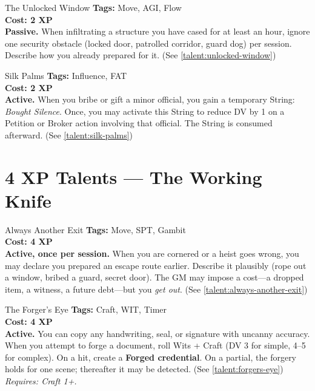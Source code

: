 \documentclass[10pt,twoside]{book}
\begin{document}
\begin{talentbox}{The Unlocked Window}
\textbf{Tags:} Move, AGI, Flow \\
\textbf{Cost: 2 XP} \\
\textbf{Passive.} When infiltrating a structure you have cased for at least an hour, ignore one security obstacle (locked door, patrolled corridor, guard dog) per session. Describe how you already prepared for it. (See \ref{talent:unlocked-window})
\end{talentbox}

\begin{talentbox}{Silk Palms}
\textbf{Tags:} Influence, FAT \\
\textbf{Cost: 2 XP} \\
\textbf{Active.} When you bribe or gift a minor official, you gain a temporary String: \textit{Bought Silence}. Once, you may activate this String to reduce DV by 1 on a Petition or Broker action involving that official. The String is consumed afterward. (See \ref{talent:silk-palms})
\end{talentbox}

\section{4 XP Talents --- The Working Knife}

\begin{talentbox}{Always Another Exit}
\textbf{Tags:} Move, SPT, Gambit \\
\textbf{Cost: 4 XP} \\
\textbf{Active, once per session.} When you are cornered or a heist goes wrong, you may declare you prepared an escape route earlier. Describe it plausibly (rope out a window, bribed a guard, secret door). The GM may impose a cost---a dropped item, a witness, a future debt---but you \emph{get out}. (See \ref{talent:always-another-exit})
\end{talentbox}

\begin{talentbox}{The Forger's Eye}
\textbf{Tags:} Craft, WIT, Timer \\
\textbf{Cost: 4 XP} \\
\textbf{Active.} You can copy any handwriting, seal, or signature with uncanny accuracy. When you attempt to forge a document, roll Wits + Craft (DV 3 for simple, 4--5 for complex). On a hit, create a \textbf{Forged credential}. On a partial, the forgery holds for one scene; thereafter it may be detected. (See \ref{talent:forgers-eye}) \\
\textit{Requires: Craft 1+.}
\end{talentbox}
\end{document}
